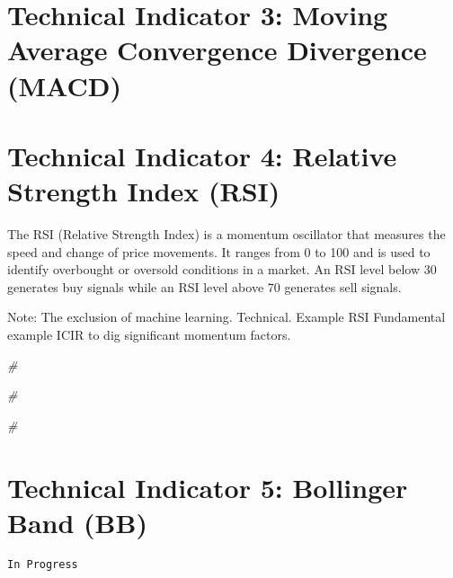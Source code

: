 \documentclass[
]{book}
\newenvironment{Shaded}{\begin{snugshade}}{\end{snugshade}}
\newcommand{\CommentTok}[1]{\textcolor[rgb]{0.56,0.35,0.01}{\textit{#1}}}
\begin{document}
\hypertarget{technical-indicator-3-moving-average-convergence-divergence-macd}{%
\section{Technical Indicator 3: Moving Average Convergence Divergence
(MACD)}\label{technical-indicator-3-moving-average-convergence-divergence-macd}}

\hypertarget{technical-indicator-4-relative-strength-index-rsi}{%
\section{Technical Indicator 4: Relative Strength Index
(RSI)}\label{technical-indicator-4-relative-strength-index-rsi}}

The RSI (Relative Strength Index) is a momentum oscillator that measures
the speed and change of price movements. It ranges from 0 to 100 and is
used to identify overbought or oversold conditions in a market. An RSI
level below 30 generates buy signals while an RSI level above 70
generates sell signals.

Note: The exclusion of machine learning. Technical. Example RSI
Fundamental example ICIR to dig significant momentum factors.

\begin{Shaded}
\begin{Highlighting}[]
\CommentTok{\#}
\end{Highlighting}
\end{Shaded}

\begin{Shaded}
\begin{Highlighting}[]
\CommentTok{\#}
\end{Highlighting}
\end{Shaded}

\begin{Shaded}
\begin{Highlighting}[]
\CommentTok{\#}
\end{Highlighting}
\end{Shaded}

\hypertarget{technical-indicator-5-bollinger-band-bb}{%
\section{Technical Indicator 5: Bollinger Band
(BB)}\label{technical-indicator-5-bollinger-band-bb}}

\texttt{In\ Progress}
\end{document}

